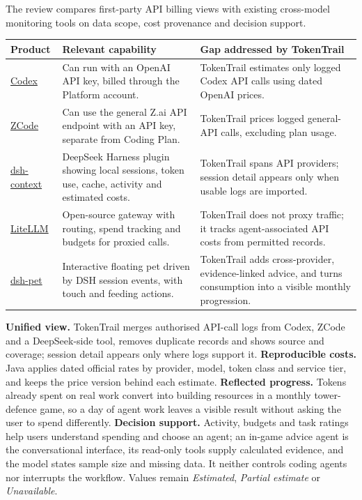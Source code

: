 \documentclass[10pt,a4paper]{article}
\newcommand{\sect}[1]{\vspace{3pt}{\large\bfseries#1}\par\vspace{1pt}}
\begin{document}
\sect{2. Related products and opportunity}
The review compares first-party API billing views with existing cross-model monitoring tools on data scope, cost provenance and decision support.\par
\begin{tabularx}{\linewidth}{@{}>{\raggedright\arraybackslash}p{27mm}Y Y@{}}
\toprule
{}
\textbf{Product} & \textbf{Relevant capability} & \textbf{Gap addressed by TokenTrail} \\
\midrule
\href{https://learn.chatgpt.com/docs/auth}{Codex} & Can run with an OpenAI API key, billed through the Platform account. & TokenTrail estimates only logged Codex API calls using dated OpenAI prices. \\
\href{https://zcode.z.ai/en/docs/configuration}{ZCode} & Can use the general Z.ai API endpoint with an API key, separate from Coding Plan. & TokenTrail prices logged general-API calls, excluding plan usage. \\
\href{https://github.com/bowenliang123/dsh-context/blob/main/README.md}{dsh-context} & DeepSeek Harness plugin showing local sessions, token use, cache, activity and estimated costs. & TokenTrail spans API providers; session detail appears only when usable logs are imported. \\
\href{https://docs.litellm.ai/docs/simple_proxy}{LiteLLM} & Open-source gateway with routing, spend tracking and budgets for proxied calls. & TokenTrail does not proxy traffic; it tracks agent-associated API costs from permitted records. \\
\href{https://github.com/zhu1090093659/dsh-pet/blob/main/README.zh.md}{dsh-pet} & Interactive floating pet driven by DSH session events, with touch and feeding actions. & TokenTrail adds cross-provider, evidence-linked advice, and turns consumption into a visible monthly progression. \\
\bottomrule
\end{tabularx}
\sect{3. Proposed contribution}
\textbf{Unified view.} TokenTrail merges authorised API-call logs from Codex, ZCode and a DeepSeek-side tool, removes duplicate records and shows source and coverage; session detail appears only where logs support it. \textbf{Reproducible costs.} Java applies dated official rates by provider, model, token class and service tier, and keeps the price version behind each estimate. \textbf{Reflected progress.} Tokens already spent on real work convert into building resources in a monthly tower-defence game, so a day of agent work leaves a visible result without asking the user to spend differently. \textbf{Decision support.} Activity, budgets and task ratings help users understand spending and choose an agent; an in-game advice agent is the conversational interface, its read-only tools supply calculated evidence, and the model states sample size and missing data. It neither controls coding agents nor interrupts the workflow. Values remain \emph{Estimated}, \emph{Partial estimate} or \emph{Unavailable}.
\end{document}
